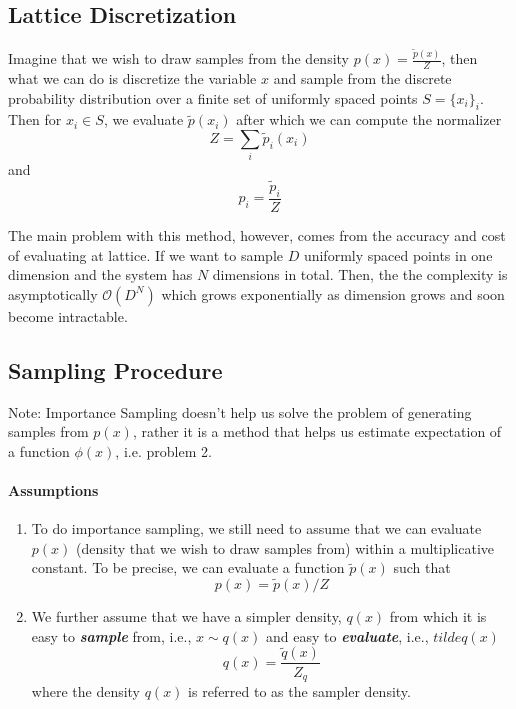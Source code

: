\documentclass[11pt]{article}
\begin{document}
\subsection{Lattice Discretization}
Imagine that we wish to draw samples from the density
$p(x)=\frac{\tilde{p}(x)}{Z}$, then what we can do is discretize the variable $x$ and sample from the discrete probability distribution over a finite set of uniformly spaced points $S = \{x_i\}_i$. Then for $x_i \in S$, we evaluate $\tilde p (x_i)$ after which we can compute the normalizer
\begin{equation}
    Z = \sum_i \tilde p_i (x_i)
\end{equation}
and
\begin{equation}
    p_{i}=\frac{\tilde{p}_{i}}{Z}
\end{equation}

The main problem with this method, however, comes from the accuracy and cost of evaluating at lattice. If we want to sample $D$ uniformly spaced points in one dimension and the system has $N$ dimensions in total. Then, the the complexity is asymptotically $\mathcal{O}(D^N)$ which grows exponentially as dimension grows and soon become intractable. 

\subsection{Sampling Procedure}
Note: Importance Sampling doesn't help us solve the problem of generating samples from $p(x)$, rather it is a method that helps us estimate expectation of a function $\phi (x)$, i.e. problem 2. 
\paragraph{Assumptions}
\begin{enumerate}
    \item To do importance sampling, we still need to assume that we can evaluate $p(x)$ (density that we wish to draw samples from) within a multiplicative constant. To be precise, we can evaluate a function $\tilde p(x)$ such that 
        \begin{equation}
            p(x) = \tilde p(x) / Z
        \end{equation}
    \item We further assume that we have a simpler density, $q(x)$ from which it is easy to \textit{\textbf{sample}} from, i.e., $x \sim q(x)$ and easy to \textit{\textbf{evaluate}}, i.e., $tilde q(x)$
        \begin{equation}
            q(x)=\frac{\tilde{q}(x)}{Z_{q}}
        \end{equation}
    where the density $q(x)$ is referred to as the sampler density. 
\end{enumerate}
\end{document}

